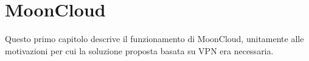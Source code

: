 \chapter{MoonCloud}\label{chap:moonclud}
Questo primo capitolo descrive il funzionamento di MoonCloud,
unitamente alle motivazioni per cui la soluzione proposta basata
su VPN era necessaria.




